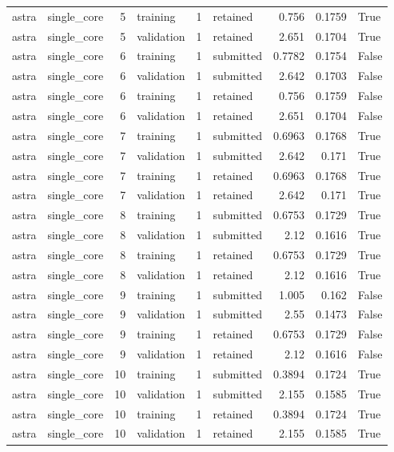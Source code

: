 \begin{tabular}{llrlrlrrl}
astra & single\_core & 5 & training & 1 & retained & 0.756 & 0.1759 & True \\
astra & single\_core & 5 & validation & 1 & retained & 2.651 & 0.1704 & True \\
astra & single\_core & 6 & training & 1 & submitted & 0.7782 & 0.1754 & False \\
astra & single\_core & 6 & validation & 1 & submitted & 2.642 & 0.1703 & False \\
astra & single\_core & 6 & training & 1 & retained & 0.756 & 0.1759 & False \\
astra & single\_core & 6 & validation & 1 & retained & 2.651 & 0.1704 & False \\
astra & single\_core & 7 & training & 1 & submitted & 0.6963 & 0.1768 & True \\
astra & single\_core & 7 & validation & 1 & submitted & 2.642 & 0.171 & True \\
astra & single\_core & 7 & training & 1 & retained & 0.6963 & 0.1768 & True \\
astra & single\_core & 7 & validation & 1 & retained & 2.642 & 0.171 & True \\
astra & single\_core & 8 & training & 1 & submitted & 0.6753 & 0.1729 & True \\
astra & single\_core & 8 & validation & 1 & submitted & 2.12 & 0.1616 & True \\
astra & single\_core & 8 & training & 1 & retained & 0.6753 & 0.1729 & True \\
astra & single\_core & 8 & validation & 1 & retained & 2.12 & 0.1616 & True \\
astra & single\_core & 9 & training & 1 & submitted & 1.005 & 0.162 & False \\
astra & single\_core & 9 & validation & 1 & submitted & 2.55 & 0.1473 & False \\
astra & single\_core & 9 & training & 1 & retained & 0.6753 & 0.1729 & False \\
astra & single\_core & 9 & validation & 1 & retained & 2.12 & 0.1616 & False \\
astra & single\_core & 10 & training & 1 & submitted & 0.3894 & 0.1724 & True \\
astra & single\_core & 10 & validation & 1 & submitted & 2.155 & 0.1585 & True \\
astra & single\_core & 10 & training & 1 & retained & 0.3894 & 0.1724 & True \\
astra & single\_core & 10 & validation & 1 & retained & 2.155 & 0.1585 & True \\

\end{tabular}

